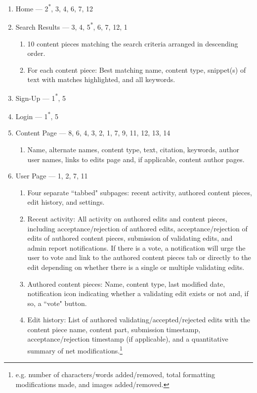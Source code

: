 \documentclass[12pt,letterpaper]{article}
\begin{document}
\begin{enumerate}
\item[1.] Home --- 2\textsuperscript{*}, 3, 4, 6, 7, 12
\item[2.] Search Results --- 3, 4, 5\textsuperscript{*}, 6, 7, 12, 1
\begin{enumerate}
\item[] 10 content pieces matching the search criteria arranged in descending order.
\item[] For each content piece: Best matching name, content type, snippet(s) of text with matches highlighted, and all keywords.
\end{enumerate}
\item[3.] Sign-Up --- 1\textsuperscript{*}, 5
\item[4.] Login --- 1\textsuperscript{*}, 5
\item[5.] Content Page --- 8, 6, 4, 3, 2, 1, 7, 9, 11, 12, 13, 14
\begin{enumerate}
\item[] Name, alternate names, content type, text, citation, keywords, author user names, links to edits page and, if applicable, content author pages.
\end{enumerate}
\item[6.] User Page  --- 1, 2, 7, 11
\begin{enumerate}
\item[] Four separate ``tabbed" subpages: recent activity, authored content pieces, edit history, and settings. 
\item[] Recent activity: All activity on authored edits and content pieces, including acceptance/rejection of authored edits, acceptance/rejection of edits of authored content pieces, submission of validating edits, and admin report notifications. If there is a vote, a notification will urge the user to vote and link to the authored content pieces tab or directly to the edit depending on whether there is a single or multiple validating edits.
\item[] Authored content pieces: Name, content type, last modified date, notification icon indicating whether a validating edit exists or not and, if so, a ``vote" button.
\item[] Edit history: List of authored validating/accepted/rejected edits with the content piece name, content part, submission timestamp, acceptance/rejection timestamp (if applicable), and a quantitative summary of net modifications.\footnote{e.g. number of characters/words added/removed, total formatting modifications made, and images added/removed.}

\end{enumerate}
\end{enumerate}
\end{document}
